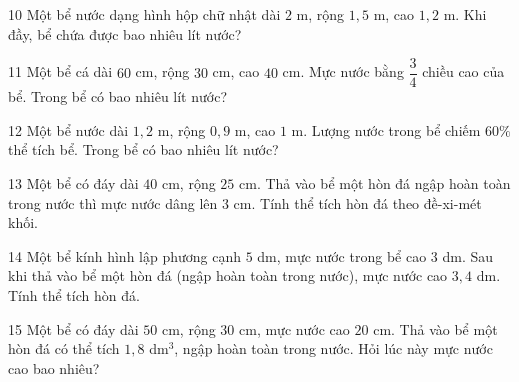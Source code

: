 \gap
\begin{probbox}{10}{\relax}
Một bể nước dạng hình hộp chữ nhật dài $2$ m, rộng $1{,}5$ m, cao $1{,}2$ m. Khi đầy, bể chứa được bao nhiêu lít nước?
\end{probbox}
\gap
\begin{probbox}{11}{\relax}
Một bể cá dài $60$ cm, rộng $30$ cm, cao $40$ cm. Mực nước bằng $\dfrac34$ chiều cao của bể. Trong bể có bao nhiêu lít nước?
\end{probbox}
\gap
\begin{probbox}{12}{\relax}
Một bể nước dài $1{,}2$ m, rộng $0{,}9$ m, cao $1$ m. Lượng nước trong bể chiếm $60\%$ thể tích bể. Trong bể có bao nhiêu lít nước?
\end{probbox}
\gap
\begin{probbox}{13}{\relax}
Một bể có đáy dài $40$ cm, rộng $25$ cm. Thả vào bể một hòn đá ngập hoàn toàn trong nước thì mực nước dâng lên $3$ cm. Tính thể tích hòn đá theo đề-xi-mét khối.
\end{probbox}
\gap
\begin{probbox}{14}{\relax}
Một bể kính hình lập phương cạnh $5$ dm, mực nước trong bể cao $3$ dm. Sau khi thả vào bể một hòn đá (ngập hoàn toàn trong nước), mực nước cao $3{,}4$ dm. Tính thể tích hòn đá.
\end{probbox}
\gap
\begin{probbox}{15}{\relax}
Một bể có đáy dài $50$ cm, rộng $30$ cm, mực nước cao $20$ cm. Thả vào bể một hòn đá có thể tích $1{,}8$ dm$^3$, ngập hoàn toàn trong nước. Hỏi lúc này mực nước cao bao nhiêu?
\end{probbox}
